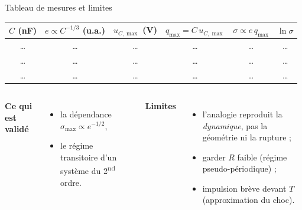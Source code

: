 \documentclass[11pt,aspectratio=169]{beamer}
\begin{document}
\begin{frame}{Tableau de mesures et limites}
  \centering\scriptsize
  \begin{tabular}{cccccc}
  \hline
  $C$ (nF) & $e\propto C^{-1/3}$ (u.a.) & $u_{C,\max}$ (V) & $q_{\max}=C\,u_{C,\max}$ & $\sigma\propto e\,q_{\max}$ & $\ln\sigma$ \\
  \hline
  \dots & \dots & \dots & \dots & \dots & \dots \\
  \dots & \dots & \dots & \dots & \dots & \dots \\
  \dots & \dots & \dots & \dots & \dots & \dots \\
  \hline
  \end{tabular}
  \vspace{0.4cm}
  \begin{columns}[T]
    \footnotesize\textbf{Ce qui est validé}
    \begin{itemize}\scriptsize
      \item la dépendance $\sigma_{\max}\propto e^{-1/2}$,
      \item le régime transitoire d'un système du 2\textsuperscript{nd} ordre.
    \end{itemize}
    \footnotesize\textbf{Limites}
    \begin{itemize}\scriptsize
      \item l'analogie reproduit la \emph{dynamique}, pas la géométrie ni la
            rupture ;
      \item garder $R$ faible (régime pseudo-périodique) ;
      \item impulsion brève devant $T$ (approximation du choc).
    \end{itemize}
  \end{columns}
\end{frame}
\end{document}
